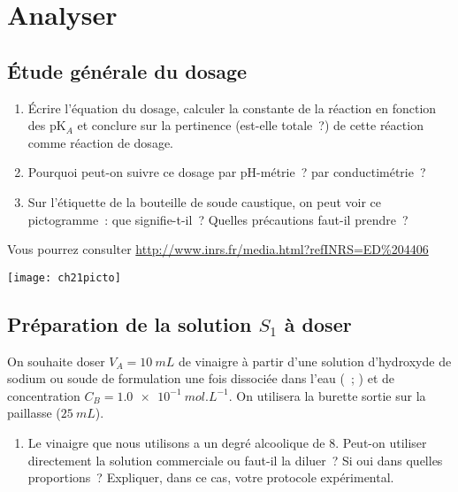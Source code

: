 \documentclass[a4paper, 10pt, final, garamond]{book}
\begin{document}
\section{Analyser}
\subsection{Étude générale du dosage}

\vspace{-10pt}
\begin{minipage}{0.75\linewidth}
    \begin{enumerate}[label=\clenumi]
        \item Écrire l'équation du dosage, calculer la constante de la réaction
            en fonction des pK$_A$ et conclure sur la pertinence (est-elle
            totale~?) de cette réaction comme réaction de dosage.
        \item Pourquoi peut-on suivre ce dosage par pH-métrie~? par
            conductimétrie~?
        \item Sur l'étiquette de la bouteille de soude caustique, on peut voir
            ce pictogramme~: que signifie-t-il~? Quelles précautions faut-il
            prendre~? 
    \end{enumerate}
    Vous pourrez consulter \url{http://www.inrs.fr/media.html?refINRS=ED%204406}
\end{minipage}
\hfill
\begin{minipage}{0.20\linewidth}
    \begin{center}
        \texttt{[image: ch21picto]}
    \end{center} 
\end{minipage}

\subsection{Préparation de la solution $S_1$ à doser}

On souhaite doser $V_A = \SI{10}{mL}$ de vinaigre à partir d'une solution
d'hydroxyde de sodium ou soude de formulation une fois dissociée dans l'eau 
(~; ) et de concentration $C_B = \SI{1,0e-1}{mol.L^{-1}}$. On
utilisera la burette sortie sur la paillasse ($\SI{25}{mL}$).

\bigbreak

\begin{enumerate}[label=\clenumi, resume]
    \item Le vinaigre que nous utilisons a un degré alcoolique de 8. Peut-on
        utiliser directement la solution commerciale ou faut-il la diluer~? Si
        oui dans quelles proportions~? Expliquer, dans ce cas, votre protocole
        expérimental.
\end{enumerate}
\end{document}
